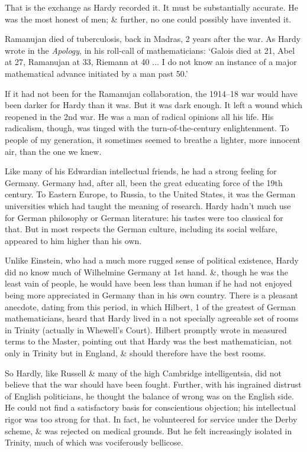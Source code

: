 \documentclass{article}
\numberwithin{equation}{section}
\begin{document}
That is the exchange as Hardy recorded it. It must be substantially accurate. He was the most honest of men; \& further, no one could possibly have invented it.

Ramanujan died of tuberculosis, back in Madras, 2 years after the war. As Hardy wrote in the \textit{Apology}, in his roll-call of mathematicians: `Galois died at 21, Abel at 27, Ramanujan at 33, Riemann at 40 $\ldots$ I do not know an instance of a major mathematical advance initiated by a man past 50.'

If it had not been for the Ramanujan collaboration, the 1914--18 war would have been darker for Hardy than it was. But it was dark enough. It left a wound which reopened in the 2nd war. He was a man of radical opinions all his life. His radicalism, though, was tinged with the turn-of-the-century enlightenment. To people of my generation, it sometimes seemed to breathe a lighter, more innocent air, than the one we knew.

Like many of his Edwardian intellectual friends, he had a strong feeling for Germany. Germany had, after all, been the great educating force of the 19th century. To Eastern Europe, to Russia, to the United States, it was the German universities which had taught the meaning of research. Hardy hadn't much use for German philosophy or German literature: his tastes were too classical for that. But in most respects the German culture, including its social welfare, appeared to him higher than his own.

Unlike Einstein, who had a much more rugged sense of political existence, Hardy did no know much of Wilhelmine Germany at 1st hand. \&, though he was the least vain of people, he would have been less than human if he had not enjoyed being more appreciated in Germany than in his own country. There is a pleasant anecdote, dating from this period, in which Hilbert, 1 of the greatest of German mathematicians, heard that Hardy lived in a not specially agreeable set of rooms in Trinity (actually in Whewell's Court). Hilbert promptly wrote in measured terms to the Master, pointing out that Hardy was the best mathematician, not only in Trinity but in England, \& should therefore have the best rooms.

So Hardly, like Russell \& many of the high Cambridge intelligentsia, did not believe that the war should have been fought. Further, with his ingrained distrust of English politicians, he thought the balance of wrong was on the English side. He could not find a satisfactory basis for conscientious objection; his intellectual rigor was too strong for that. In fact, he volunteered for service under the Derby scheme, \& was rejected on medical grounds. But he felt increasingly isolated in Trinity, much of which was vociferously bellicose.
\end{document}
